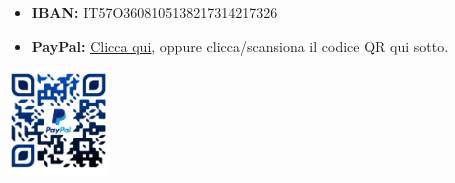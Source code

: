 \section*{}
\begin{itemize}
\item \textbf{IBAN:} IT57O3608105138217314217326\\
\item \textbf{PayPal:} \href{\PayPallink}{\underline{Clicca qui}}, oppure clicca/scansiona il codice QR qui sotto.
\end{itemize}
\vspace{2.5mm}
\begin{center}
  \href{\PayPallink}{
    \includegraphics[width=0.2\textwidth]{../QR_PayPal.png}
  }
\end{center}